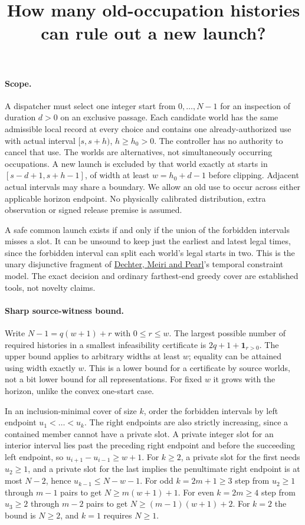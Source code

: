 \documentclass{article}
\title{How many old-occupation histories can rule out a new launch?}
\date{}
\begin{document}
\maketitle

\paragraph{Scope.}
A dispatcher must select one integer start from $0,\ldots,N-1$ for an inspection of duration $d>0$ on an exclusive passage. Each candidate world has the same admissible local record at every choice and contains one already-authorized use with actual interval $[s,s+h)$, $h\ge h_0>0$. The controller has no authority to cancel that use. The worlds are alternatives, not simultaneously occurring occupations. A new launch is excluded by that world exactly at starts in $[s-d+1,s+h-1]$, of width at least $w=h_0+d-1$ before clipping. Adjacent actual intervals may share a boundary. We allow an old use to occur across either applicable horizon endpoint. No physically calibrated distribution, extra observation or signed release premise is assumed.

A safe common launch exists if and only if the union of the forbidden intervals misses a slot. It can be unsound to keep just the earliest and latest legal times, since the forbidden interval can split each world's legal starts in two. This is the unary disjunctive fragment of \href{https://cse.unl.edu/~choueiry/Documents/DechterMeiri-AIJ.pdf}{Dechter, Meiri and Pearl}'s temporal constraint model. The exact decision and ordinary farthest-end greedy cover are established tools, not novelty claims.

\paragraph{Sharp source-witness bound.}
Write $N-1=q(w+1)+r$ with $0\le r\le w$. The largest possible number of required histories in a smallest infeasibility certificate is $2q+1+\mathbf{1}_{r>0}$. The upper bound applies to arbitrary widths at least $w$; equality can be attained using width exactly $w$. This is a lower bound for a certificate by source worlds, not a bit lower bound for all representations. For fixed $w$ it grows with the horizon, unlike the convex one-start case.

In an inclusion-minimal cover of size $k$, order the forbidden intervals by left endpoint $u_1<\dots<u_k$. The right endpoints are also strictly increasing, since a contained member cannot have a private slot. A private integer slot for an interior interval lies past the preceding right endpoint and before the succeeding left endpoint, so $u_{i+1}-u_{i-1}\ge w+1$. For $k\ge2$, a private slot for the first needs $u_2\ge1$, and a private slot for the last implies the penultimate right endpoint is at most $N-2$, hence $u_{k-1}\le N-w-1$. For odd $k=2m+1\ge3$ step from $u_2\ge1$ through $m-1$ pairs to get $N\ge m(w+1)+1$. For even $k=2m\ge4$ step from $u_3\ge2$ through $m-2$ pairs to get $N\ge(m-1)(w+1)+2$. For $k=2$ the bound is $N\ge2$, and $k=1$ requires $N\ge1$.
\end{document}
